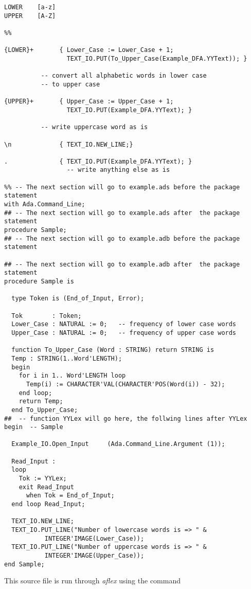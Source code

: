 \small
\begin{verbatim}
LOWER    [a-z]
UPPER    [A-Z]

%%

{LOWER}+       { Lower_Case := Lower_Case + 1; 
                 TEXT_IO.PUT(To_Upper_Case(Example_DFA.YYText)); }

		  -- convert all alphabetic words in lower case
		  -- to upper case

{UPPER}+       { Upper_Case := Upper_Case + 1;
                 TEXT_IO.PUT(Example_DFA.YYText); }

		  -- write uppercase word as is

\n             { TEXT_IO.NEW_LINE;}

.              { TEXT_IO.PUT(Example_DFA.YYText); }
                 -- write anything else as is

%% -- The next section will go to example.ads before the package statement
with Ada.Command_Line;
## -- The next section will go to example.ads after  the package statement
procedure Sample;
## -- The next section will go to example.adb before the package statement

## -- The next section will go to example.adb after  the package statement
procedure Sample is

  type Token is (End_of_Input, Error);

  Tok        : Token;
  Lower_Case : NATURAL := 0;   -- frequency of lower case words
  Upper_Case : NATURAL := 0;   -- frequency of upper case words

  function To_Upper_Case (Word : STRING) return STRING is
  Temp : STRING(1..Word'LENGTH);
  begin
    for i in 1.. Word'LENGTH loop
      Temp(i) := CHARACTER'VAL(CHARACTER'POS(Word(i)) - 32); 
    end loop;
    return Temp;
  end To_Upper_Case;  
##  -- function YYLex will go here, the follwing lines after YYLex
begin  -- Sample

  Example_IO.Open_Input     (Ada.Command_Line.Argument (1));

  Read_Input :
  loop
    Tok := YYLex;
    exit Read_Input
      when Tok = End_of_Input;
  end loop Read_Input;

  TEXT_IO.NEW_LINE;
  TEXT_IO.PUT_LINE("Number of lowercase words is => " & 
		   INTEGER'IMAGE(Lower_Case));
  TEXT_IO.PUT_LINE("Number of uppercase words is => " & 
		   INTEGER'IMAGE(Upper_Case));
end Sample;
\end{verbatim}
\normalsize

This source file is run through {\sl aflex} using the command

